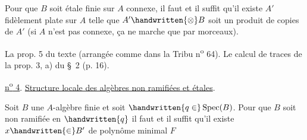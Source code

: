Pour que $B$ soit étale finie sur $A$ connexe, il faut et il suffit qu'il existe
$A'$ fidèlement plate sur $A$ telle que $A'\handwritten{\otimes}B$ soit un produit de copies de $A'$
(si $A$ n'est pas connexe, ça ne marche que par morceaux).

La prop. 5 du texte (arrangée comme dans la Tribu n\textsuperscript{o} 64). Le calcul de traces de
la prop. 3, a) du \S~2 (p. 16).

\uline{n\textsuperscript{o} 4}. \uline{Structure locale des algèbres non ramifiées et étales}.

Soit $B$ une $A$-algèbre finie et soit $\handwritten{q\in}\operatorname{Spec}(B)$. Pour que $B$ soit non
ramifiée en $\handwritten{q}$ il faut et il suffit qu'il existe $x\handwritten{\in} B'$ de polynôme minimal $F$
